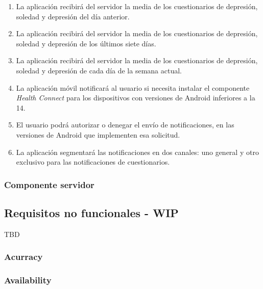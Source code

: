 \begin{enumerate}[label=\textbf{\texttt{RF-\arabic*}}]
            \item La aplicación recibirá del servidor la media de los cuestionarios de depresión, soledad y depresión del día anterior.
            \item La aplicación recibirá del servidor la media de los cuestionarios de depresión, soledad y depresión de los últimos siete días.
            \item La aplicación recibirá del servidor la media de los cuestionarios de depresión, soledad y depresión de cada día de la semana actual. 

            \item La aplicación móvil notificará al usuario si necesita instalar el componente \textit{Health Connect} para los dispositivos con versiones de Android inferiores a la 14.

            \item El usuario podrá autorizar o denegar el envío de notificaciones, en las versiones de Android que implementen esa solicitud.
            \item La aplicación segmentará las notificaciones en dos canales: uno general y otro exclusivo para las notificaciones de cuestionarios.

        \end{enumerate}

        \subsubsection{Componente servidor}
    
    \subsection{Requisitos no funcionales - WIP}
        \label{req:especificos:no_funcionales}
        TBD
        \subsubsection{Acurracy}
        \subsubsection{Availability}
